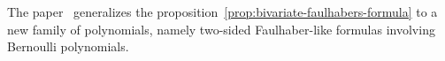 The paper~\cite{barbero2020two} generalizes the proposition~\eqref{prop:bivariate-faulhabers-formula} to a new family
of polynomials, namely two-sided Faulhaber-like formulas involving Bernoulli polynomials.
